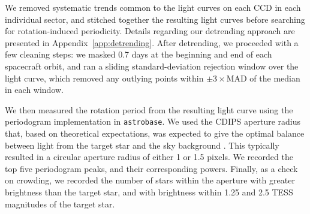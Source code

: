 \documentclass[12pt,twocolumn,tighten]{aastex63}
\begin{document}
We removed systematic trends common to the light curves on each
CCD in each individual sector, and stitched together the resulting
light curves before searching for rotation-induced periodicity.
Details regarding our detrending approach are presented in
Appendix~\ref{app:detrending}.  After detrending, we proceeded with a
few cleaning steps: we masked 0.7 days at the beginning and end of
each spacecraft orbit, and ran a sliding standard-deviation rejection
window over the light curve, which removed any outlying points within
$\pm3\times$MAD of the median in each window.

We then measured the rotation period from the resulting light curve using
the  periodogram implementation in
\texttt{astrobase}.
We used the CDIPS aperture radius that, based on theoretical
expectations, was expected to give the optimal balance between light from
the target star and the sky background \citep{Sullivan_2015}.  This
typically resulted in a circular aperture radius of either 1 or 1.5
pixels.  We recorded the top five periodogram peaks, and their corresponding powers.  Finally, as a check on
crowding, we recorded the number of stars within the aperture with
greater brightness than the target star, and with brightness within 1.25
and 2.5 TESS magnitudes of the target star.
\end{document}
